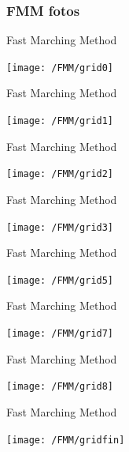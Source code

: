\documentclass[10pt]{beamer}
\begin{document}
\subsubsection{FMM fotos}
\begin{frame}{Fast Marching Method}
	\begin{center}	
	\texttt{[image: /FMM/grid0]}	
	\end{center}
\end{frame}
\begin{frame}{Fast Marching Method}\addtocounter{framenumber}{-1}
	\begin{center}	
	\texttt{[image: /FMM/grid1]}	
	\end{center}
\end{frame}
\begin{frame}{Fast Marching Method}\addtocounter{framenumber}{-1}
	\begin{center}	
	\texttt{[image: /FMM/grid2]}	
	\end{center}
\end{frame}
\begin{frame}{Fast Marching Method}\addtocounter{framenumber}{-1}
	\begin{center}	
	\texttt{[image: /FMM/grid3]}	
	\end{center}
\end{frame}
\begin{frame}{Fast Marching Method}\addtocounter{framenumber}{-1}
	\begin{center}	
	\texttt{[image: /FMM/grid5]}	
	\end{center}
\end{frame}
\begin{frame}{Fast Marching Method}\addtocounter{framenumber}{-1}
	\begin{center}	
	\texttt{[image: /FMM/grid7]}	
	\end{center}
\end{frame}
\begin{frame}{Fast Marching Method}\addtocounter{framenumber}{-1}
	\begin{center}	
	\texttt{[image: /FMM/grid8]}	
	\end{center}
\end{frame}
\begin{frame}{Fast Marching Method}\addtocounter{framenumber}{-1}
	\begin{center}	
	\texttt{[image: /FMM/gridfin]}	
	\end{center}
\end{frame}
\end{document}
